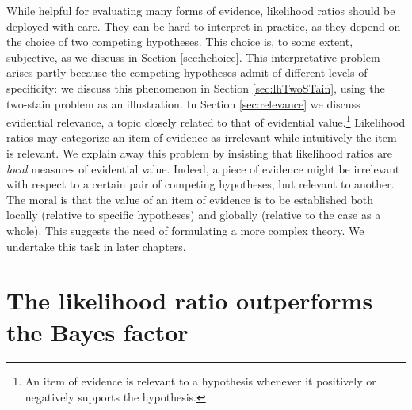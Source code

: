 \documentclass[
  10pt,
  dvipsnames,enabledeprecatedfontcommands]{scrartcl}
\begin{document}
While helpful for evaluating many forms of evidence, likelihood ratios
should be deployed with care. They can be hard to interpret in practice,
as they depend on the choice of two competing hypotheses. This choice
is, to some extent, subjective, as we discuss in Section
\ref{sec:hchoice}. This interpretative problem arises partly because the
competing hypotheses admit of different levels of specificity: we
discuss this phenomenon in Section \ref{sec:lhTwoSTain}, using the
two-stain problem as an illustration. In Section \ref{sec:relevance} we
discuss evidential relevance, a topic closely related to that of
evidential value.\footnote{An item of evidence is relevant to a
  hypothesis whenever it positively or negatively supports the
  hypothesis.} Likelihood ratios may categorize an item of evidence as
irrelevant while intuitively the item is relevant. We explain away this
problem by insisting that likelihood ratios are \textit{local} measures
of evidential value. Indeed, a piece of evidence might be irrelevant
with respect to a certain pair of competing hypotheses, but relevant to
another. The moral is that the value of an item of evidence is to be
established both locally (relative to specific hypotheses) and globally
(relative to the case as a whole). This suggests the need of formulating
a more complex theory. We undertake this task in later chapters.

\hypertarget{the-likelihood-ratio-outperforms-the-bayes-factor}{%
\section{The likelihood ratio outperforms the Bayes
factor}\label{the-likelihood-ratio-outperforms-the-bayes-factor}}

\label{sec:lr}
\end{document}
